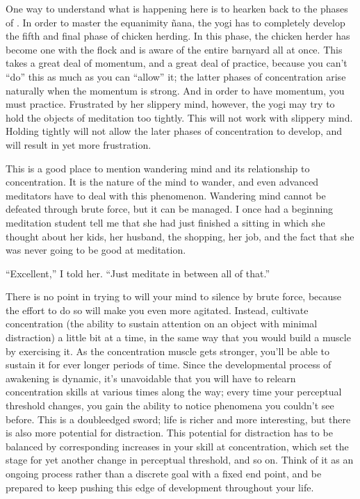\documentclass[a5paper,10pt,english]{book}
\begin{document}
\sphinxAtStartPar
One way to understand what is happening here is to hearken back to the
phases of {\hyperref[\detokenize{back-jhana-nana:chicken-herding}]{}}. In order to master the
equanimity ñana, the yogi has to completely develop the fifth and final
phase of chicken herding. In this phase, the chicken herder has become
one with the flock and is aware of the entire barnyard all at once. This
takes a great deal of momentum, and a great deal of practice, because
you can’t “do” this as much as you can “allow” it; the latter phases of
concentration arise naturally when the momentum is strong. And in order
to have momentum, you must practice. Frustrated by her slippery mind,
however, the yogi may try to hold the objects of meditation too tightly.
This will not work with slippery mind. Holding tightly will not allow
the later phases of concentration to develop, and will result in yet
more frustration.

\sphinxAtStartPar
This is a good place to mention wandering mind and its relationship to
concentration. It is the nature of the mind to wander, and even advanced
meditators have to deal with this phenomenon. Wandering mind cannot be
defeated through brute force, but it can be managed. I once had a
beginning meditation student tell me that she had just finished a
sitting in which she thought about her kids, her husband, the shopping,
her job, and the fact that she was never going to be good at meditation.

\sphinxAtStartPar
“Excellent,” I told her. “Just meditate in between all of that.”

\sphinxAtStartPar
There is no point in trying to will your mind to silence by brute force,
because the effort to do so will make you even more agitated. Instead,
cultivate concentration (the ability to sustain attention on an object
with minimal distraction) a little bit at a time, in the same way that
you would build a muscle by exercising it. As the concentration muscle
gets stronger, you’ll be able to sustain it for ever longer periods of
time. Since the developmental process of awakening is dynamic, it’s
unavoidable that you will have to relearn concentration skills at
various times along the way; every time your perceptual threshold
changes, you gain the ability to notice phenomena you couldn’t see
before. This is a double\sphinxhyphen{}edged sword; life is richer and more
interesting, but there is also more potential for distraction. This
potential for distraction has to be balanced by corresponding increases
in your skill at concentration, which set the stage for yet another
change in perceptual threshold, and so on. Think of it as an ongoing
process rather than a discrete goal with a fixed end point, and be
prepared to keep pushing this edge of development throughout your life.
\end{document}
